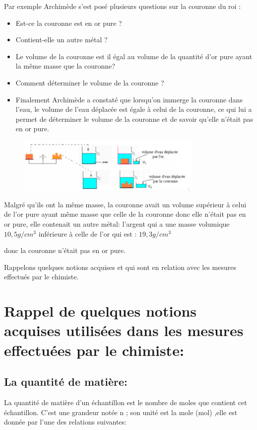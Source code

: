\documentclass[12pt]{article}
\begin{document}
Par exemple Archimède s'est posé plusieurs questions sur la couronne du roi :
\begin{itemize}
	\item Est-ce la couronne est en or pure ?
	\item Contient-elle un autre métal ?
	\item Le volume de la couronne est il égal au volume de la quantité d'or pure ayant la même masse que la couronne?
	\item Comment déterminer le volume de la couronne ?
	\item Finalement Archimède a constaté que lorsqu'on immerge la couronne dans l'eau, le volume de l'eau déplacée est égale à celui de la
couronne, ce qui lui a permet de déterminer le volume de la couronne et de savoir qu'elle n'était pas en or pure.  
\end{itemize}
\begin{figure}[h!]
\begin{center}
	\includegraphics[width=0.8\textwidth]{./chimiste.png}
\end{center}
\end{figure}
Malgré qu'ils ont la même masse, la couronne avait un volume supérieur à celui de l'or pure ayant même masse que celle de la
couronne donc elle n'était pas en or pure, elle contenait un autre métal: l'argent qui a une masse volumique
$10,5g/cm^3$ inférieure à celle de l'or qui est : $19,3g/cm^3$

donc la couronne n'était pas en or pure.

Rappelons quelques notions acquises et qui sont en relation avec les mesures effectués par le chimiste.



\section{Rappel de quelques notions acquises utilisées dans les mesures effectuées par le chimiste:}
\subsection{La quantité de matière:}
La quantité de matière d'un échantillon est le nombre de moles que contient cet échantillon. C'est une grandeur notée n ; son unité
est la mole (mol) ,elle est donnée par l'une des relations suivantes:
 
\end{document}
